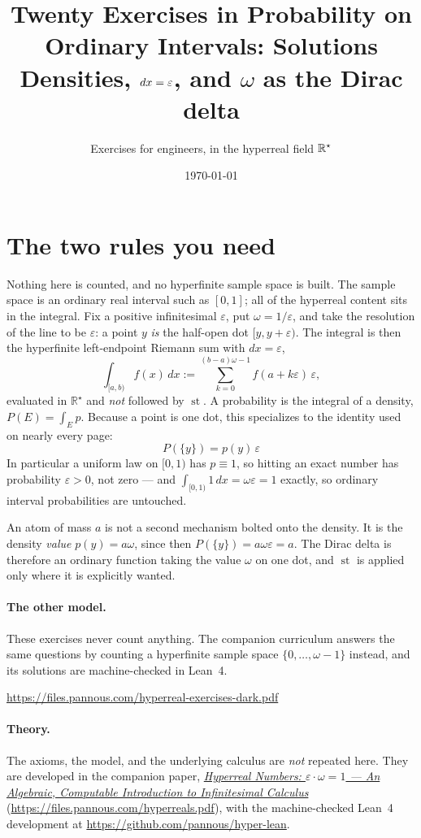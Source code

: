 \documentclass[11pt]{article}
\title{Twenty Exercises in Probability on Ordinary Intervals: Solutions\\
\large Densities, $dx=\eps$, and $\omega$ as the Dirac delta}
\author{Exercises for engineers, in the hyperreal field $\Rstar$}
\date{\today}
\newcommand{\Rstar}{\mathbb{R}^{\star}}
\newcommand{\eps}{\varepsilon}
\newcommand{\st}{\operatorname{st}}
\begin{document}
\maketitle


\section*{The two rules you need}

Nothing here is counted, and no hyperfinite sample space is built. The sample
space is an ordinary real interval such as $[0,1]$; all of the hyperreal
content sits in the integral. Fix a positive infinitesimal $\eps$, put
$\omega = 1/\eps$, and take the resolution of the line to be $\eps$: a point
$y$ \emph{is} the half-open dot $[y, y+\eps)$. The integral is then the
hyperfinite left-endpoint Riemann sum with $dx = \eps$,
\[
  \int_{[a,b)} f(x)\,dx
  := \sum_{k=0}^{(b-a)\omega-1} f(a+k\eps)\,\eps ,
\]
evaluated in $\Rstar$ and \emph{not} followed by $\st$. A probability is the
integral of a density, $P(E)=\int_E p$. Because a point is one dot, this
specializes to the identity used on nearly every page:
\[
  \boxed{\;P(\{y\}) = p(y)\,\eps\;}
\]
In particular a uniform law on $[0,1)$ has $p \equiv 1$, so hitting an exact
number has probability $\eps > 0$, not zero --- and $\int_{[0,1)} 1\,dx
= \omega\eps = 1$ exactly, so ordinary interval probabilities are untouched.

An atom of mass $a$ is not a second mechanism bolted onto the density. It is
the density \emph{value} $p(y)=a\omega$, since then $P(\{y\})=a\omega\eps=a$.
The Dirac delta is therefore an ordinary function taking the value $\omega$ on
one dot, and $\st$ is applied only where it is explicitly wanted.

\paragraph{The other model.} These exercises never count anything. The
companion curriculum answers the same questions by counting a hyperfinite
sample space $\{0,\dots,\omega-1\}$ instead, and its solutions are
machine-checked in Lean~4.
\begin{center}\small\url{https://files.pannous.com/hyperreal-exercises-dark.pdf}\end{center}

\paragraph{Theory.} The axioms, the model, and the underlying calculus are
\emph{not} repeated here. They are developed in the companion paper,
\href{https://files.pannous.com/hyperreals.pdf}{\emph{Hyperreal Numbers: $\eps\cdot\omega=1$ --- An
Algebraic, Computable Introduction to Infinitesimal Calculus}}
(\url{https://files.pannous.com/hyperreals.pdf}), with the machine-checked Lean~4 development at
\url{https://github.com/pannous/hyper-lean}.
\end{document}
